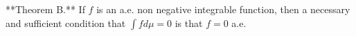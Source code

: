 **Theorem B.** If $f$ is an a.e. non negative integrable function, then a necessary and sufficient condition that $\int f d\mu = 0$ is that $f = 0$ a.e.
